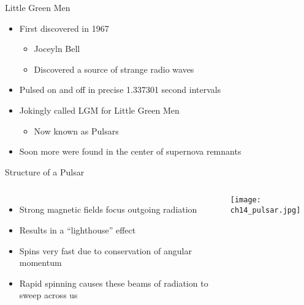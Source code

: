 \documentclass[pdf,aspectratio=169]{beamer}
\begin{document}
\begin{frame}{Little Green Men}
  \begin{itemize}
	\item First discovered in 1967
	  \begin{itemize}
		\item Joceyln Bell
		\item Discovered a source of strange radio waves
	  \end{itemize}
	\item Pulsed on and off in precise 1.337301 second intervals
	\item Jokingly called LGM for Little Green Men
	  \begin{itemize}
		\item Now known as \alert{Pulsars}
	  \end{itemize}
	\item Soon more were found in the center of supernova remnants
  \end{itemize}
\end{frame}


\begin{frame}{Structure of a Pulsar}
  \begin{columns}
	\begin{itemize}
	  \item Strong magnetic fields focus outgoing radiation
	  \item Results in a ``lighthouse'' effect
	  \item Spins very fast due to conservation of angular momentum
	  \item Rapid spinning causes these beams of radiation to sweep across us
	\end{itemize}
	\begin{center}
	  \texttt{[image: ch14\_pulsar.jpg]}
	\end{center}
  \end{columns}
\end{frame}

\end{document}
